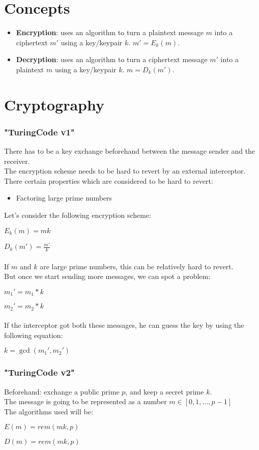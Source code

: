 \documentclass{article}
\begin{document}
	\section{Concepts}
	\begin{itemize}
		\item \textbf{Encryption}: uses an algorithm to turn a plaintext message $m$ into a ciphertext $m'$ using a key/keypair $k$. $m' = E_k(m)$.
		\item \textbf{Decryption}: uses an algorithm to turn a ciphertext message $m'$ into a plaintext $m$ using a key/keypair $k$. $m = D_k(m')$.
	\end{itemize}
	
	\section{Cryptography}
	\subsubsection{"TuringCode v1"}
	There has to be a key exchange beforehand between the message sender and the receiver.\\
	The encryption scheme needs to be hard to revert by an external interceptor.\\
	There certain properties which are considered to be hard to revert:
	\begin{itemize}
		\item Factoring large prime numbers
	\end{itemize}
	Let's consider the following encryption scheme:
	
	$E_k(m) = mk$
	
	$D_k(m') = \frac{m'}{k}$\\
	\\
	If $m$ and $k$ are large prime numbers, this can be relatively hard to revert.\\
	But once we start sending more messages, we can spot a problem:
	
	$m_1' = m_1 * k$
	
	$m_2' = m_2 * k$\\
	\\
	If the interceptor got both these messages, he can guess the key by using the following equation:
	
	$k = \gcd(m_1', m_2')$
	
	\pagebreak
	
	\subsubsection{"TuringCode v2"}
	Beforehand: exchange a public prime $p$, and keep a secret prime $k$.\\
	The message is going to be represented as a number $m \in [0, 1, ..., p - 1]$\\
	The algorithms used will be:
	
	$E(m) = rem(mk, p)$
	
	$D(m) = rem(mk, p)$
	
	
\end{document}
